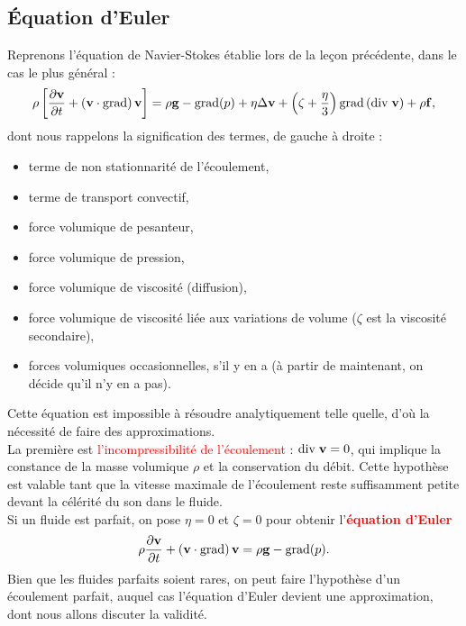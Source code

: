 \documentclass[11pt,a4paper]{report}
\begin{document}
\subsection{\'Equation d'Euler}

Reprenons l'équation de Navier-Stokes établie lors de la leçon précédente, dans le cas le plus général :
\begin{equation}
	\rho\left[\frac{\partial\bold{v}}{\partial t}+\left(\bold{v}\cdot\bold{\text{grad}}\right)\bold{v}\right]=\rho\bold{g}-\bold{\text{grad}}(p)+\eta\Delta\bold{v} 
	+ \left(\zeta + \frac{\eta}{3}\right)\bold{\text{grad}}\left(\text{div}\;\bold{v}\right) + \rho\bold{f},
\end{equation}
dont nous rappelons la signification des termes, de gauche à droite :
\begin{itemize}
	\item terme de non stationnarité de l'écoulement,
	\item terme de transport convectif,
	\item force volumique de pesanteur,
	\item force volumique de pression,
	\item force volumique de viscosité (diffusion),
	\item force volumique de viscosité liée aux variations de volume ($\zeta$ est la viscosité secondaire),
	\item forces volumiques occasionnelles, s'il y en a (à partir de maintenant, on décide qu'il n'y en a pas).
\end{itemize}

Cette équation est impossible à résoudre analytiquement telle quelle, d'où la nécessité de faire des approximations.\\

La première est \textcolor{red}{l'incompressibilité de l'écoulement} : $\text{div}\;\bold{v} = 0$, qui implique la constance de la masse volumique $\rho$ et la conservation du débit. Cette hypothèse est valable tant que la vitesse maximale de l'écoulement reste suffisamment petite devant la célérité du son dans le fluide.\\

Si un fluide est parfait, on pose $\eta = 0$ et $\zeta = 0$ pour obtenir l'\textcolor{red}{\textbf{équation d'Euler}}
\begin{equation}
	\rho\frac{\partial\bold{v}}{\partial t}+\left(\bold{v}\cdot\bold{\text{grad}}\right)\bold{v}=\rho\bold{g}-\bold{\text{grad}}(p).
\end{equation} 
Bien que les fluides parfaits soient rares, on peut faire l'hypothèse d'un écoulement parfait, auquel cas l'équation d'Euler devient une approximation, dont nous allons discuter la validité.
\end{document}

